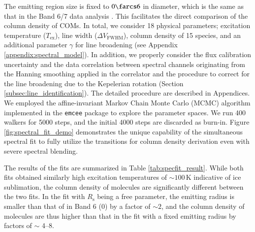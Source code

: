 \documentclass[linenumbers, twocolumn, twocolappendix, astrosymb, times]{aastex631}
\newcommand{\methanol}{CH$_3$OH\xspace}
\newcommand{\acetaldehyde}{CH$_3$CHO\xspace}
\newcommand{\acetone}{CH$_3$COCH$_3$\xspace}
\newcommand{\ethyleneoxide}{$c$-C$_2$H$_4$O\xspace}
\begin{document}
The emitting region size is fixed to $0\farcs6$ in diameter, which is the same as that in the Band 6/7 data analysis \citep{Lee2019}. This facilitates the direct comparison of the column density of COMs. In total, we consider 18 physical parameters; excitation temperature ($T_\mathrm{ex}$), line width ($\Delta V_\mathrm{FWHM}$), column density of 15 species, and an additional parameter $\gamma$ for line broadening (see Appendix \ref{appendix:spectral_model}). In addition, we properly consider the flux calibration uncertainty and the data correlation between spectral channels originating from the Hanning smoothing applied in the correlator and the procedure to correct for the line broadening due to the Kepelerian rotation (Section \ref{subsec:line_identification}). The detailed procedure are described in Appendices. We employed the affine-invariant Markov Chain Monte Carlo (MCMC) algorithm implemented in the \texttt{emcee} package \citep{emcee} to explore the parameter spaces. We run 400 walkers for 5000 steps, and the initial 4000 steps are discarded as burn-in. Figure \ref{fig:spectral_fit_demo} demonstrates the unique capability of the simultaneous spectral fit to fully utilize the transitions for column density derivation even with severe spectral blending. 

The results of the fits are summarized in Table \ref{tab:specfit_result}. While both fits obtained similarly high excitation temperatures of $\sim100$\,K indicative of ice sublimation, the column density of molecules are significantly different between the two fits. In the fit with $R_\mathrm{s}$ being a free parameter, the emitting radius is smaller than that of in Band 6 (0) by a factor of $\sim2$, and the column density of molecules are thus higher than that in the fit with a fixed emitting radius by factors of $\sim$ 4--8.

\begin{figure*}
\caption{Demonstration of the simultaneous spectral fit for a selected frequency range in SPW 7. The observed spectra (grey) is well reproduced by the model (black) composed of multiple blended transitions of different species, \methanol, \acetaldehyde, \acetone, \ethyleneoxide, and CH$_3^{13}$CHO (dashed colored lines).}
\label{fig:spectral_fit_demo}
\end{figure*}
\end{document}
